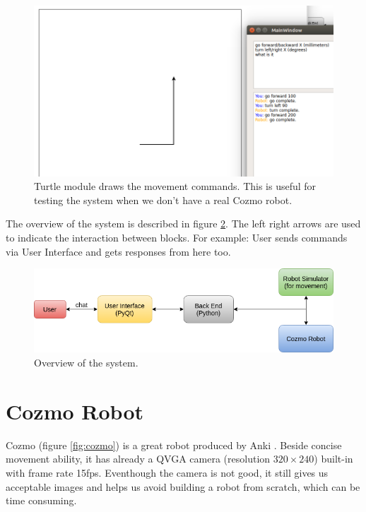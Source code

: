 \begin{figure}[!htb]
	\centering
	\includegraphics[width=0.8\hsize]{./figures/simulator}
	\caption{Turtle module draws the movement commands. This is useful for testing the system when we don't have a real Cozmo robot.}
	\label{fig:simulator}
\end{figure}

The overview of the system is described in figure \ref{fig:UIdesign}. The left right arrows are used to indicate the interaction between blocks. For example: User sends commands via User Interface and gets responses from here too.

\begin{figure}[!htb]
	\centering
	\includegraphics[width=1.0\hsize]{./figures/UIdesign}
	\caption{Overview of the system.}
	\label{fig:UIdesign}
\end{figure}

\section{Cozmo Robot}
Cozmo (figure \ref{fig:cozmo}) is a great robot produced by Anki \cite{AnkiOfficial:2017}. Beside concise movement ability, it has already a QVGA camera (resolution $320 \times 240$) built-in with frame rate 15fps. Eventhough the camera is not good, it still gives us acceptable images and helps us avoid building a robot from scratch, which can be time consuming. 

